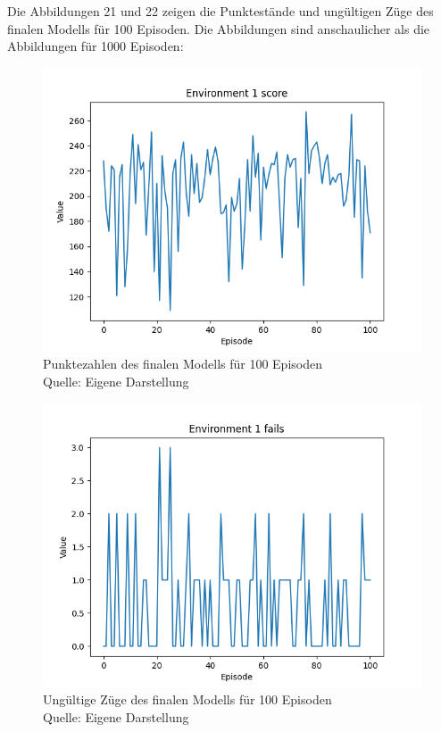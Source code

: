 Die Abbildungen 21 und 22 zeigen die Punktestände und ungültigen Züge des finalen Modells für 100 Episoden. Die Abbildungen sind anschaulicher als die Abbildungen für 1000 Episoden:
\nopagebreak
\begin{figure}[H]
	\includegraphics[width=1\textwidth]{Bilder/final4000steps} 
	\caption[Punktezahlen des finalen Modells für 100 Episoden]{Punktezahlen des finalen Modells für 100 Episoden\\ Quelle: Eigene Darstellung}
\end{figure}
\begin{figure}[H]
	\includegraphics[width=1\textwidth]{Bilder/final4000stepsf} 
	\caption[Ungültige Züge des finalen Modells für 100 Episoden]{Ungültige Züge des finalen Modells für 100 Episoden\\ Quelle: Eigene Darstellung}
\end{figure}
